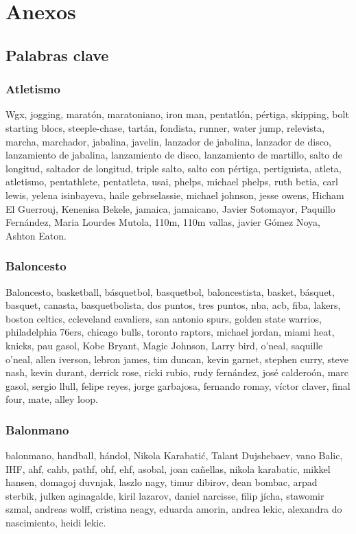 \documentclass[../all.tex]{subfiles}
\begin{document}
\section{Anexos} 

\subsection{Palabras clave}
    \subsubsection{Atletismo}
    Wgx, jogging, maratón, maratoniano, iron man, pentatlón, pértiga, skipping, bolt starting blocs, steeple-chase, tartán, fondista, runner, water jump, relevista, marcha, marchador, jabalina, javelin, lanzador de jabalina, lanzador de disco, lanzamiento de jabalina, lanzamiento de disco, lanzamiento de martillo, salto de longitud,
    saltador de longitud, triple salto, salto con pértiga, pertiguista, atleta, atletismo, pentathlete, pentatleta, usai, phelps, michael phelps, ruth betia, carl lewis, yelena isinbayeva, haile gebrselassie, michael johnson, jesse owens, Hicham El Guerrouj, Kenenisa Bekele, jamaica, jamaicano, Javier Sotomayor, Paquillo Fernández, Maria Lourdes Mutola, 110m, 110m vallas, javier Gómez Noya, Ashton Eaton.
    \subsubsection{Baloncesto}
    Baloncesto, basketball, básquetbol, basquetbol, baloncestista, basket, básquet, basquet, canasta, basquetbolista, dos puntos, tres puntos, nba, acb, fiba, lakers, boston celtics, ccleveland cavaliers, san antonio spurs, golden state warrios, philadelphia 76ers, chicago bulls, toronto raptors, michael jordan, miami heat, knicks, pau gasol, Kobe Bryant,  Magic Johnson,  Larry bird,  o'neal, saquille o'neal, allen iverson, lebron james, tim duncan, kevin garnet, stephen curry, steve nash, kevin durant, derrick rose, ricki rubio, rudy fernández, josé calderoón, marc gasol, sergio llull, felipe reyes, jorge garbajosa, fernando romay, víctor claver, final four, mate, alley loop.
    \subsubsection{Balonmano}
    balonmano, handball, hándol, Nikola Karabatić, Talant Dujshebaev, vano Balic, IHF, ahf, cahb, pathf, ohf, ehf, asobal, joan cañellas, nikola karabatic, mikkel hansen, domagoj duvnjak, laszlo nagy, timur dibirov, dean bombac, arpad sterbik, julken aginagalde, kiril lazarov, daniel narcisse, filip jícha, stawomir szmal, andreas wolff, cristina neagy, eduarda amorin, andrea lekic, alexandra do nascimiento, heidi lekic.
\end{document}
